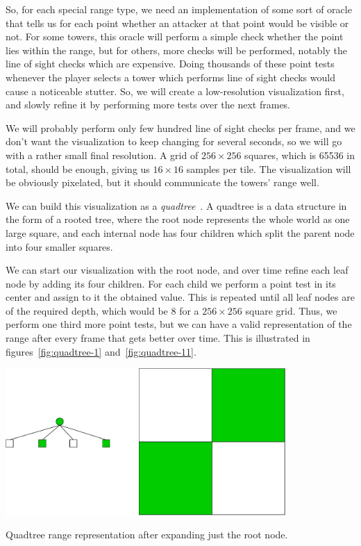 So, for each special range type, we need an implementation of some sort of oracle that tells us for each point whether an attacker at that point would be visible or not.
For some towers, this oracle will perform a simple check whether the point lies within the range, but for others, more checks will be performed, notably the line of sight checks which are expensive.
Doing thousands of these point tests whenever the player selects a tower which performs line of sight checks would cause a noticeable stutter.
So, we will create a low-resolution visualization first, and slowly refine it by performing more tests over the next frames.

We will probably perform only few hundred line of sight checks per frame, and we don't want the visualization to keep changing for several seconds, so we will go with a rather small final resolution.
A grid of $256 \times 256$ squares, which is 65536 in total, should be enough, giving us $16 \times 16$ samples per tile.
The visualization will be obviously pixelated, but it should communicate the towers' range well.

We can build this visualization as a \emph{quadtree}~\cite{Quadtree}.
A quadtree is a data structure in the form of a rooted tree, where the root node represents the whole world as one large square, and each internal node has four children which split the parent node into four smaller squares.

We can start our visualization with the root node, and over time refine each leaf node by adding its four children.
For each child we perform a point test in its center and assign to it the obtained value.
This is repeated until all leaf nodes are of the required depth, which would be 8 for a $256 \times 256$ square grid.
Thus, we perform one third more point tests, but we can have a valid representation of the range after every frame that gets better over time.
This is illustrated in figures~\ref{fig:quadtree-1} and~\ref{fig:quadtree-11}.

\begin{center}
    \captionsetup{type=figure}
    \includegraphics[width=0.8\textwidth]{img/quadtree 1.pdf}
    \caption{Quadtree range representation after expanding just the root node.}
    \label{fig:quadtree-1}
\end{center}

